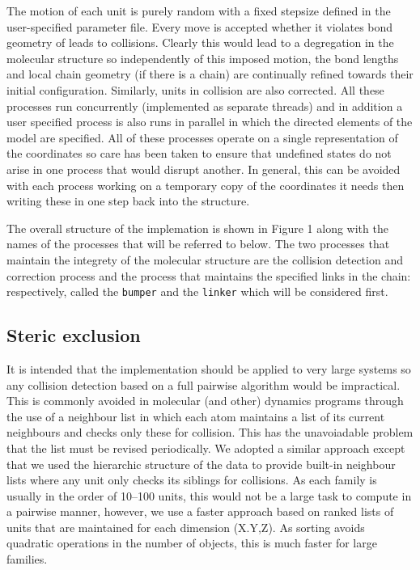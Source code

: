 The motion of each unit is purely random with a fixed stepsize
defined in the user-specified parameter file.  Every move is
accepted whether it violates bond geometry of leads to collisions.
Clearly this would lead to a degregation in the molecular structure
so independently of this imposed motion, the bond lengths and local
chain geometry (if there is a chain) are continually refined towards
their initial configuration.  Similarly, units in collision are
also corrected.   All these processes run concurrently (implemented
as separate threads) and in addition a user specified process is
also runs in parallel in which the directed elements of the model
are specified.   All of these processes operate on a single
representation of the coordinates so care has been taken to ensure
that undefined states do not arise in one process that would 
disrupt another.  In general, this can be avoided with each 
process working on a temporary copy of the coordinates it needs
then writing these in one step back into the structure.

The overall structure of the implemation is shown in Figure 1 along
with the names of the processes that will be referred to below.
The two processes that maintain the integrety of the molecular structure
are the collision detection and correction process and the process that
maintains the specified links in the chain: respectively, called the 
{\tt bumper} and the {\tt linker} which will be considered first.

\subsection{Steric exclusion}

It is intended that the implementation should be applied to very large
systems so any collision detection based on a full pairwise algorithm
would be impractical.  This is commonly avoided in molecular (and other)
dynamics programs through the use of a neighbour list in which each atom
maintains a list of its current neighbours and checks only these for
collision.  This has the unavoiadable problem that the list must be
revised periodically.   We adopted a similar approach except that we
used the hierarchic structure of the data to provide built-in neighbour
lists where any unit only checks its siblings for collisions.  As each
family is usually in the order of 10--100 units, this would not be a
large task to compute in a pairwise manner, however, we use a faster
approach based on ranked lists of units that are maintained for each
dimension (X.Y,Z).   As sorting avoids quadratic operations in the
number of objects, this is much faster for large families.

